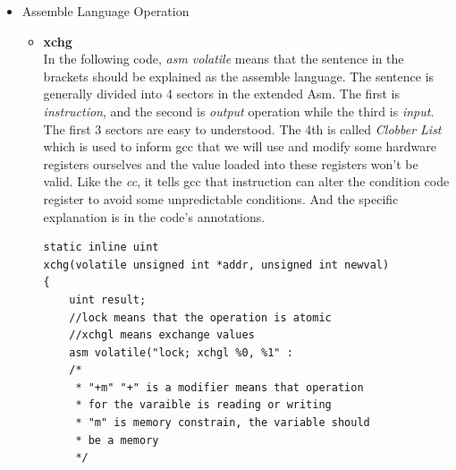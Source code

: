 \documentclass{article}
\begin{document}
	\begin{itemize}
		\item Assemble Language Operation \\
		
		\begin{itemize}
			\item \textbf{xchg} \\
			In the following code, \emph{asm volatile} means that the sentence in the brackets should be explained as the assemble language. The sentence is generally divided into 4 sectors in the extended Asm. The first is \emph{instruction}, and the second is \emph{output}  operation while the third is \emph{input}. The first 3 sectors are easy to understood. The 4th is called \emph{Clobber List} which is used to inform gcc that we will use and modify some hardware registers ourselves and the value loaded into these registers won't be valid. Like the \emph{cc}, it tells gcc that instruction can alter the condition code register to avoid some unpredictable conditions. And the specific explanation is in the code's annotations.\\
			\begin{lstlisting}
static inline uint
xchg(volatile unsigned int *addr, unsigned int newval)
{
	uint result;
	//lock means that the operation is atomic
	//xchgl means exchange values
	asm volatile("lock; xchgl %0, %1" :
	/*
	 * "+m" "+" is a modifier means that operation 
	 * for the varaible is reading or writing
	 * "m" is memory constrain, the variable should 
	 * be a memory
	 */  
	 

\end{lstlisting}
\end{itemize}
\end{itemize}
\end{document}
